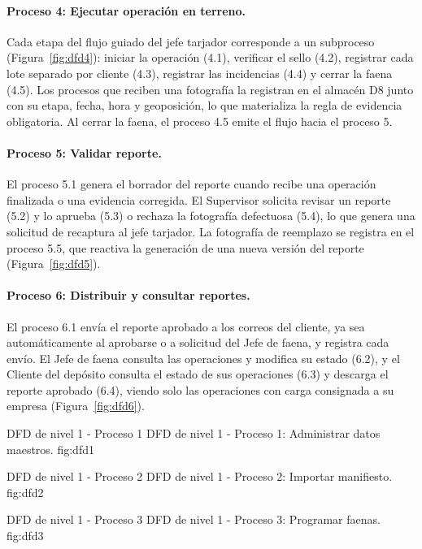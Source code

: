 \paragraph{Proceso 4: Ejecutar operación en terreno.} Cada etapa del flujo guiado del jefe
tarjador corresponde a un subproceso (Figura~\ref{fig:dfd4}): iniciar la operación (4.1),
verificar el sello (4.2), registrar cada lote separado por cliente (4.3), registrar las
incidencias (4.4) y cerrar la faena (4.5). Los procesos que reciben una fotografía la
registran en el almacén D8 junto con su etapa, fecha, hora y geoposición, lo que materializa
la regla de evidencia obligatoria. Al cerrar la faena, el proceso 4.5 emite el flujo
 hacia el proceso 5.

\paragraph{Proceso 5: Validar reporte.} El proceso 5.1 genera el borrador del reporte cuando
recibe una operación finalizada o una evidencia corregida. El Supervisor solicita revisar un
reporte (5.2) y lo aprueba (5.3) o rechaza la fotografía defectuosa (5.4), lo que genera una
solicitud de recaptura al jefe tarjador. La fotografía de reemplazo se registra en el proceso
5.5, que reactiva la generación de una nueva versión del reporte (Figura~\ref{fig:dfd5}).

\paragraph{Proceso 6: Distribuir y consultar reportes.} El proceso 6.1 envía el reporte
aprobado a los correos del cliente, ya sea automáticamente al aprobarse o a solicitud del Jefe
de faena, y registra cada envío. El Jefe de faena consulta las operaciones y modifica su
estado (6.2), y el Cliente del depósito consulta el estado de sus operaciones (6.3) y
descarga el reporte aprobado (6.4), viendo solo las operaciones con carga consignada a su
empresa (Figura~\ref{fig:dfd6}).

    {DFD de nivel 1 - Proceso 1}
    {DFD de nivel 1 - Proceso 1: Administrar datos maestros.}
    {fig:dfd1}

    {DFD de nivel 1 - Proceso 2}
    {DFD de nivel 1 - Proceso 2: Importar manifiesto.}
    {fig:dfd2}

    {DFD de nivel 1 - Proceso 3}
    {DFD de nivel 1 - Proceso 3: Programar faenas.}
    {fig:dfd3}

